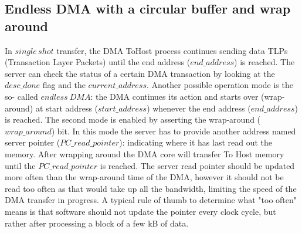 \subsection{Endless DMA with a circular buffer and wrap around}
\label{sec:endless_dma}

In $single\,shot$ transfer, the DMA ToHost process continues sending data TLPs (Transaction Layer Packets) until the end address ($end\_address$) is reached.
The server can check the status of a certain DMA transaction by looking at the $desc\_done$ flag and the $current\_address$. Another possible operation mode is the so- called $endless\ DMA$: the DMA continues its action and starts over (wrap-around) at start address ($start\_address$) whenever the end address ($end\_address$) is reached. The second mode is enabled by asserting the wrap-around ($wrap\_around$) bit. In this mode the server has to provide another address named server pointer ($PC\_read\_pointer$): indicating where it has last read out the memory. After wrapping around the DMA core will transfer To Host memory until the $PC\_read\_pointer$ is reached. The server read pointer should be updated more often than the wrap-around time of the DMA, however it should not be read too often as that would take up all the bandwidth, limiting the speed of the DMA transfer in progress. A typical rule of thumb to determine what "too often" means is that software should not update the pointer every clock cycle, but rather after processing a block of a few kB of data.

